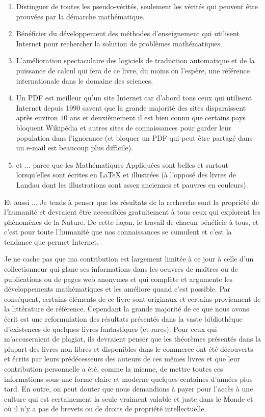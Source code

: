 \begin{enumerate}
		\item Distinguer de toutes les pseudo-vérités, seulement les vérités qui peuvent être prouvées par la démarche mathématique.

		\item Bénéficier du développement des méthodes d'enseignement qui utilisent Internet pour rechercher la solution de problèmes mathématiques.

		\item L'amélioration spectaculaire des logiciels de traduction automatique et de la puissance de calcul qui fera de ce livre, du moins on l'espère, une référence internationale dans le domaine des sciences.
		
		\item Un PDF est meilleur qu'un site Internet car d'abord tous ceux qui utilisent Internet depuis 1990 savent que la grande majorité des sites disparaissent après environ $10$ ans et deuxièmement il est bien connu que certains pays bloquent Wikipédia et autres sites de connaissances pour garder leur population dans l'ignorance (et bloquer un PDF qui peut être partagé dans un e-mail est beaucoup plus difficile).
		
		\item et ... parce que les Mathématiques Appliquées sont belles et surtout lorsqu'elles sont écrites en \LaTeX{} et illustrées (à l'opposé des livres de Landau dont les illustrations sont assez anciennes et pauvres en couleurs).
\end{enumerate}

	Et aussi ... Je tends à penser que les résultats de la recherche sont la propriété de l'humanité et devraient être accessibles gratuitement à tous ceux qui explorent les phénomènes de la Nature. De cette façon, le travail de chacun bénéficie à tous, et c'est pour toute l'humanité que nos connaissances se cumulent et c'est la tendance que permet Internet.

	Je ne cache pas que ma contribution est largement limitée à ce jour à celle d'un collectionneur qui glane ses informations dans les oeuvres de maîtres ou de publications ou de pages web anonymes et qui complète et argumente les développements mathématiques et les améliore quand c'est possible. Par conséquent, certains éléments de ce livre sont originaux et certains proviennent de la littérature de référence. Cependant la grande majorité de ce que nous avons écrit est une reformulation des résultats présentés dans la vaste bibliothèque d'existences de quelques livres fantastiques (et rares). Pour ceux qui m'accuseraient de plagiat, ils devraient penser que les théorèmes présentés dans la plupart des livres non libres et disponibles dans le commerce ont été découverts et écrits par leurs prédécesseurs des auteurs de ces mêmes livres et que leur contribution personnelle a été, comme la mienne, de mettre toutes ces informations sous une forme claire et moderne quelques centaines d'années plus tard. En outre, on peut douter que nous demandions à payer pour l'accès à une culture qui est certainement la seule vraiment valable et juste dans le Monde et où il n'y a pas de brevets ou de droits de propriété intellectuelle.
	
